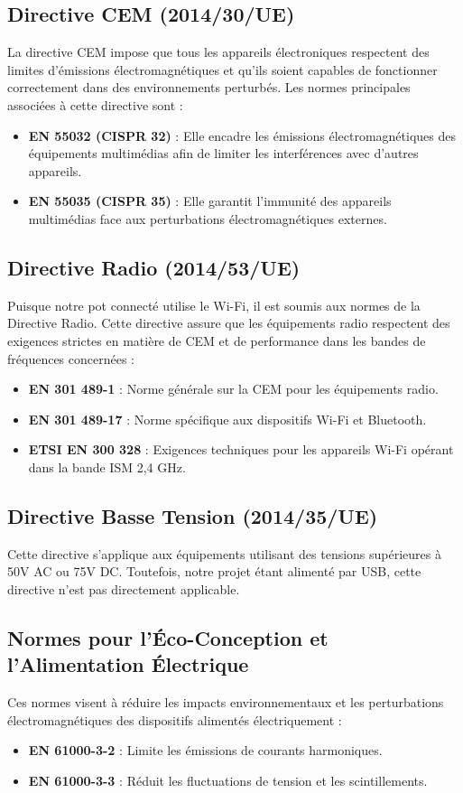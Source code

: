 \documentclass[a4paper,12pt]{article}
\begin{document}
\subsection{Directive CEM (2014/30/UE)}
La directive CEM impose que tous les appareils électroniques respectent des limites d'émissions électromagnétiques et qu'ils soient capables de fonctionner correctement dans des environnements perturbés. Les normes principales associées à cette directive sont :
\begin{itemize}
    \item \textbf{EN 55032 (CISPR 32)} : Elle encadre les émissions électromagnétiques des équipements multimédias afin de limiter les interférences avec d'autres appareils.
    \item \textbf{EN 55035 (CISPR 35)} : Elle garantit l'immunité des appareils multimédias face aux perturbations électromagnétiques externes.
\end{itemize}

\subsection{Directive Radio (2014/53/UE)}
Puisque notre pot connecté utilise le Wi-Fi, il est soumis aux normes de la Directive Radio. Cette directive assure que les équipements radio respectent des exigences strictes en matière de CEM et de performance dans les bandes de fréquences concernées :
\begin{itemize}
    \item \textbf{EN 301 489-1} : Norme générale sur la CEM pour les équipements radio.
    \item \textbf{EN 301 489-17} : Norme spécifique aux dispositifs Wi-Fi et Bluetooth.
    \item \textbf{ETSI EN 300 328} : Exigences techniques pour les appareils Wi-Fi opérant dans la bande ISM 2,4 GHz.
\end{itemize}

\subsection{Directive Basse Tension (2014/35/UE)}
Cette directive s'applique aux équipements utilisant des tensions supérieures à 50V AC ou 75V DC. Toutefois, notre projet étant alimenté par USB, cette directive n'est pas directement applicable.

\subsection{Normes pour l’Éco-Conception et l’Alimentation Électrique}
Ces normes visent à réduire les impacts environnementaux et les perturbations électromagnétiques des dispositifs alimentés électriquement :
\begin{itemize}
    \item \textbf{EN 61000-3-2} : Limite les émissions de courants harmoniques.
    \item \textbf{EN 61000-3-3} : Réduit les fluctuations de tension et les scintillements.
\end{itemize}
\end{document}
